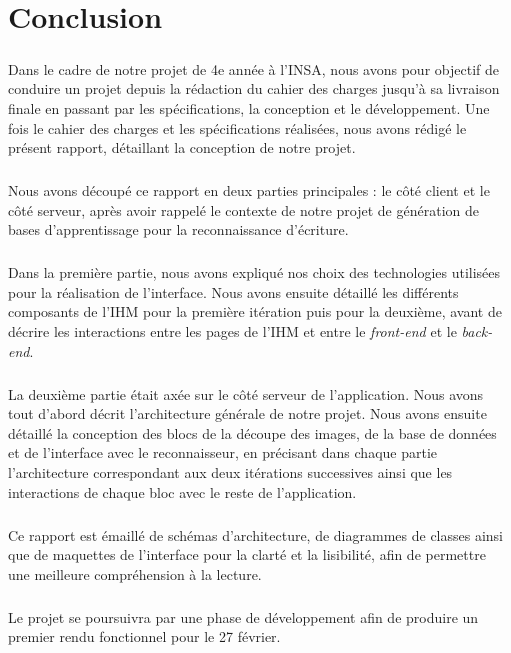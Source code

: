 \chapter{Conclusion}

\paragraph{}
Dans le cadre de notre projet de 4e année à l’INSA, nous avons pour objectif de conduire un projet depuis la rédaction du cahier des charges jusqu’à sa livraison finale en passant par les spécifications, la conception et le développement. Une fois le cahier des charges et les spécifications réalisées, nous avons rédigé le présent rapport, détaillant la conception de notre projet.

\paragraph{}
Nous avons découpé ce rapport en deux parties principales : le côté client et le côté serveur, après avoir rappelé le contexte de notre projet de génération de bases d’apprentissage pour la reconnaissance d’écriture.

\paragraph{}
Dans la première partie, nous avons expliqué nos choix des technologies utilisées pour la réalisation de l’interface. Nous avons ensuite détaillé les différents composants de l’IHM pour la première itération puis pour la deuxième, avant de décrire les interactions entre les pages de l’IHM et entre le \textit{front-end} et le \textit{back-end}.

\paragraph{}
La deuxième partie était axée sur le côté serveur de l’application. Nous avons tout d’abord décrit l’architecture générale de notre projet. Nous avons ensuite détaillé la conception des blocs de la découpe des images, de la base de données et de l’interface avec le reconnaisseur, en précisant dans chaque partie l’architecture correspondant aux deux itérations successives ainsi que les interactions de chaque bloc avec le reste de l’application.

\paragraph{}
Ce rapport est émaillé de schémas d’architecture, de diagrammes de classes ainsi que de maquettes de l’interface pour la clarté et la lisibilité, afin de permettre une meilleure compréhension à la lecture.

\paragraph{}
Le projet se poursuivra par une phase de développement afin de produire un premier rendu fonctionnel pour le 27 février.
